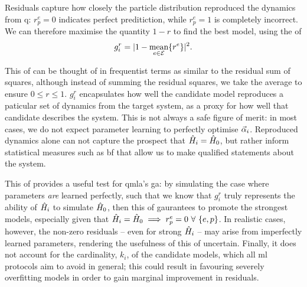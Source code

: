 Residuals capture how closely the particle distribution reproduced the dynamics from \gls{q}:
    $r^{e}_{p} = 0$ indicates perfect preditiction, while $r^e_p=1$ is completely incorrect. 
We can therefore maximise the quantity $1-r$ to find the best model, 
    using the \gls{of}
\begin{equation}
    \label{eqn:residual_fitness}
    g^r_i = \lvert 1 - \underset{e \in { \mathcal{E} }}{\text{mean}}\{ {r^e} \}\rvert^2.
\end{equation}
\par     
This \gls{of} can be thought of in frequentist terms 
    as similar to the residual sum of squares,
    although instead of summing the residual squares, we take the average to ensure $0 \leq r \leq 1$. 
$g_i^r$ encapsulates how well the candidate model reproduces a paticular set of dynamics from the target system, 
    as a proxy for how well that candidate describes the system. 
This is not always a safe figure of merit: 
    in most cases, we do not expect parameter learning to perfectly optimise $\vec{\alpha}_i$. 
Reproduced dynamics alone can not capture the prospect that $\hat{H}_i=\hat{H}_0$, 
    but rather inform statistical measures such as \gls{bf} that allow us to make 
    qualified statements about the system. \par 

This \gls{of} provides a useful test for \gls{qmla}'s \gls{ga}:
    by simulating the case where parameters \emph{are} learned perfectly, 
    such that we know that $g_i^r$ truly represents the ability of $\hat{H}_i$ to 
    simulate $\hat{H}_0$, then this \gls{of} gaurantees to promote  the strongest models,
    especially given that $\hat{H}_i=\hat{H}_0 \implies r_p^e=0 \ \forall \ \{e, p\}$. 
In realistic cases, however, the non-zero residuals -- even for 
    strong $\hat{H}_i$ -- may arise from imperfectly learned parameters,
    rendering the usefulness of this \gls{of} uncertain. 
Finally, it does not account for the cardinality, $k_i$, of the candidate models,
    which all \gls{ml} protocols aim to avoid in general;
    this could result in favouring severely overfitting models in order to 
    gain marginal improvement in residuals.

